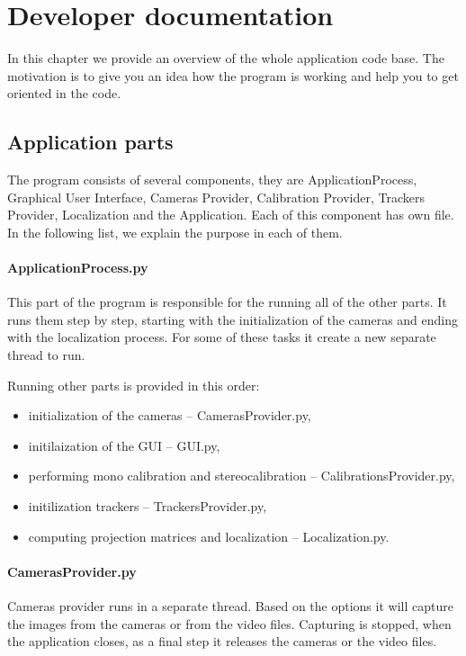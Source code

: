 \chapter{Developer documentation}

In this chapter we provide an overview of the whole application code base. The
motivation is to give you an idea how the program is working and help you to
get oriented in the code.

\section{Application parts}

The program consists of several components, they are ApplicationProcess,
Graphical User Interface, Cameras Provider, Calibration Provider, Trackers
Provider, Localization and the Application. Each of this component has own
file. In the following list, we explain the purpose in each of them.

\subsubsection*{ApplicationProcess.py}

This part of the program is responsible for the running all of the other parts.
It runs them step by step, starting with the initialization of the cameras and
ending with the localization process. For some of these tasks it create a new
separate thread to run.

Running other parts is provided in this order:
\begin{itemize}
\item initialization of the cameras -- CamerasProvider.py,
\item initilaization of the GUI -- GUI.py,
\item performing mono calibration and stereocalibration -- CalibrationsProvider.py,
\item initilization trackers -- TrackersProvider.py,
\item computing projection matrices and localization -- Localization.py.
\end{itemize}

\subsubsection*{CamerasProvider.py}

Cameras provider runs in a separate thread. Based on the options it will
capture the images from the cameras or from the video files. Capturing is
stopped, when the application closes, as a final step it releases the cameras or
the video files.

